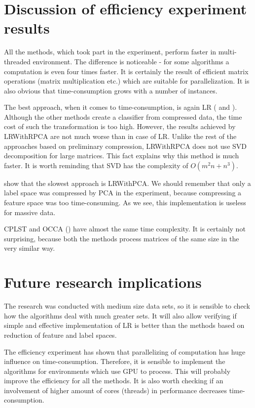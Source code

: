 \section{Discussion of efficiency experiment results}

All the methods, which took part in the experiment, perform faster in multi-threaded environment. The difference is noticeable - for some algorithms a computation is even four times faster. It is certainly the result of efficient matrix operations (matrix multiplication etc.) which are suitable for parallelization. It is also obvious that time-consumption grows with a number of instances.

The best approach, when it comes to time-consumption, is again LR ( and ). Although the other methods create a classifier from compressed data, the time cost of such the transformation is too high. However, the results achieved by LRWithRPCA are not much worse than in case of LR. Unlike the rest of the approaches based on preliminary compression, LRWithRPCA does not use SVD decomposition for large matrices. This fact explains why this method is much faster. It is worth reminding that SVD has the complexity of $O(m^2n+n^3)$. 

 show that the slowest approach is LRWithPCA. We should remember that only a label space was compressed by PCA in the experiment, because compressing a feature space was too time-consuming. As we see, this implementation is useless for massive data. 

CPLST and OCCA () have almost the same time complexity. It is certainly not surprising, because both the methods process matrices of the same size in the very similar way.

\section{Future research implications}

The research was conducted with medium size data sets, so it is sensible to check how the algorithms deal with much greater sets. It will also allow verifying if simple and effective implementation of LR is better than the methods based on reduction of feature and label spaces. 

The efficiency experiment has shown that parallelizing of computation has huge influence on time-consumption. Therefore, it is sensible to implement the algorithms for environments which use GPU to process. This will probably improve the efficiency for all the methods. It is also worth checking if an involvement of higher amount of cores (threads) in performance decreases time-consumption.  

